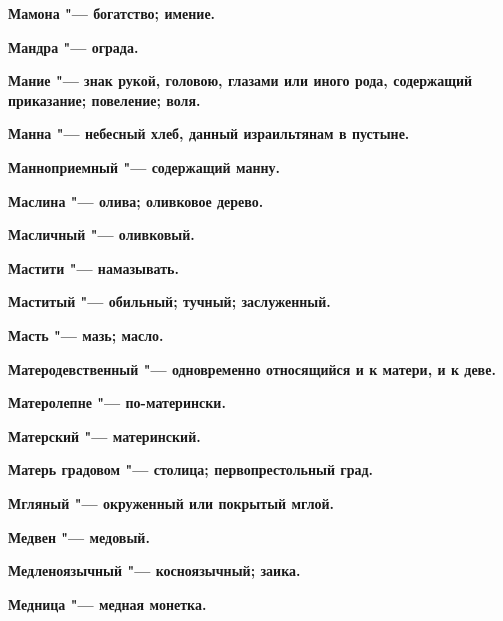 \begin{mymulticols}{2}
\bfseries Мамона\normalfont{} "--- богатство; имение. 




\bfseries Мандра\normalfont{} "--- ограда. 




\bfseries Мание\normalfont{} "--- знак рукой, головою, глазами или иного рода, содержащий приказание; повеление; воля. 




\bfseries Манна\normalfont{} "--- небесный хлеб, данный израильтянам в пустыне. 




\bfseries Манноприемный\normalfont{} "--- содержащий манну. 




\bfseries Маслина\normalfont{} "--- олива; оливковое дерево. 




\bfseries Масличный\normalfont{} "--- оливковый. 




\bfseries Мастити\normalfont{} "--- намазывать. 




\bfseries Маститый\normalfont{} "--- обильный; тучный; заслуженный. 




\bfseries Масть\normalfont{} "--- мазь; масло. 




\bfseries Матеродевственный\normalfont{} "--- одновременно относящийся и к матери, и к деве. 




\bfseries Матеролепне\normalfont{} "--- по-матерински. 




\bfseries Матерский\normalfont{} "--- материнский. 




\bfseries Матерь градовом\normalfont{} "--- столица; первопрестольный град. 




\bfseries Мгляный\normalfont{} "--- окруженный или покрытый мглой. 




\bfseries Медвен\normalfont{} "--- медовый. 




\bfseries Медленоязычный\normalfont{} "--- косноязычный; заика. 




\bfseries Медница\normalfont{} "--- медная монетка. 





\end{mymulticols}
